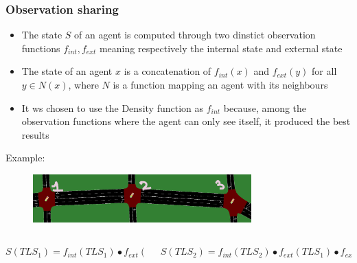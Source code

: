 \documentclass[dvipsnames]{beamer}
\begin{document}
\begin{frame}
\frametitle{Observation sharing}

  {\footnotesize
  \begin{itemize}
    \item The state $S$ of an agent is computed through two dinstict observation functions $f_{int}, f_{ext}$ meaning respectively the internal state and external state \\
    \item The state of an agent $x$ is a concatenation of $f_{int}(x)$ and $f_{ext}(y)$ for all $y \in N(x)$, where $N$ is a function mapping an agent with its neighbours \\
    \item It ws chosen to use the Density function as $f_{int}$ because, among the observation functions where the agent can only see itself, it produced the best results
  \end{itemize}
  }

  Example:
  \begin{figure}
    \centering
    \includegraphics[width=0.75\textwidth]{figures/sumo-rf-tls-triplet.png}
  \end{figure}

  
  \begin{columns}
    \begin{column}{0.4\textwidth}
      \centering
      {\footnotesize$S({TLS}_{1}) = f_{int}({TLS}_{1}) \bullet f_{ext}({TLS}_{2})$}
    \end{column}
    \begin{column}{0.6\textwidth}
      \centering
      {\footnotesize$S({TLS}_{2}) = f_{int}({TLS}_{2}) \bullet f_{ext}({TLS}_{1}) \bullet f_{ext}({TLS}_{3})$}
    \end{column}
  \end{columns}
\end{frame}
\end{document}
